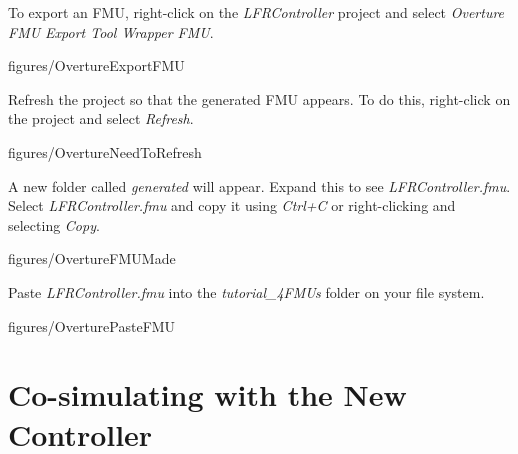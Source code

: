 \documentclass[11pt,a4paper]{../tutorial}
\begin{document}
\begin{instructions}
\item \label{step:exp1} To export an FMU, right-click on the \emph{LFRController} project and select \emph{Overture FMU \menusep Export Tool Wrapper FMU}.

    \begin{annotation}[width=0.99\linewidth]{figures/OvertureExportFMU}
    \end{annotation}

\newpage
\item Refresh the project so that the generated FMU appears. To do this, right-click on the project and select \emph{Refresh}.

    \begin{annotation}[width=0.99\linewidth,trim=0 250 0 0,clip]{figures/OvertureNeedToRefresh}
    \end{annotation}

\item A new folder called \emph{generated} will appear. Expand this to see \emph{LFRController.fmu}. Select \emph{LFRController.fmu} and copy it using \emph{Ctrl+C} or right-clicking and selecting \emph{Copy}.

    \begin{annotation}[width=0.25\linewidth,trim=0 340 535 60,clip]{figures/OvertureFMUMade}
    \end{annotation}

\item \label{step:exp2} Paste \emph{LFRController.fmu} into the \emph{tutorial\_4\pathsep{}FMUs} folder on your file system.

    \begin{annotation}[width=0.8\linewidth]{figures/OverturePasteFMU}
    \end{annotation}

\end{instructions}

\newpage
\section{Co-simulating with the New Controller}
\end{document}
